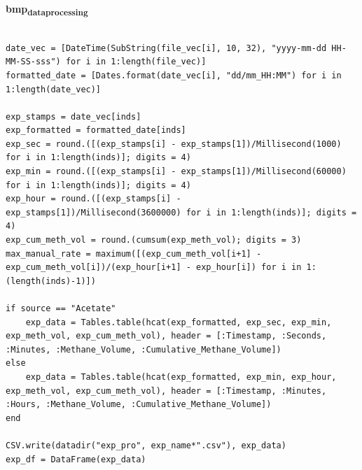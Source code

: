 \documentclass[11pt]{article}
\begin{document}
\textbf{bmp\textsubscript{data}\textsubscript{processing}}
\begin{verbatim}

date_vec = [DateTime(SubString(file_vec[i], 10, 32), "yyyy-mm-dd HH-MM-SS-sss") for i in 1:length(file_vec)]
formatted_date = [Dates.format(date_vec[i], "dd/mm_HH:MM") for i in 1:length(date_vec)]

exp_stamps = date_vec[inds]
exp_formatted = formatted_date[inds]
exp_sec = round.([(exp_stamps[i] - exp_stamps[1])/Millisecond(1000) for i in 1:length(inds)]; digits = 4)
exp_min = round.([(exp_stamps[i] - exp_stamps[1])/Millisecond(60000) for i in 1:length(inds)]; digits = 4)
exp_hour = round.([(exp_stamps[i] - exp_stamps[1])/Millisecond(3600000) for i in 1:length(inds)]; digits = 4)
exp_cum_meth_vol = round.(cumsum(exp_meth_vol); digits = 3)
max_manual_rate = maximum([(exp_cum_meth_vol[i+1] - exp_cum_meth_vol[i])/(exp_hour[i+1] - exp_hour[i]) for i in 1:(length(inds)-1)])

if source == "Acetate"
    exp_data = Tables.table(hcat(exp_formatted, exp_sec, exp_min, exp_meth_vol, exp_cum_meth_vol), header = [:Timestamp, :Seconds, :Minutes, :Methane_Volume, :Cumulative_Methane_Volume])
else
    exp_data = Tables.table(hcat(exp_formatted, exp_min, exp_hour, exp_meth_vol, exp_cum_meth_vol), header = [:Timestamp, :Minutes, :Hours, :Methane_Volume, :Cumulative_Methane_Volume])
end

CSV.write(datadir("exp_pro", exp_name*".csv"), exp_data)
exp_df = DataFrame(exp_data)

\end{verbatim}
\end{document}
